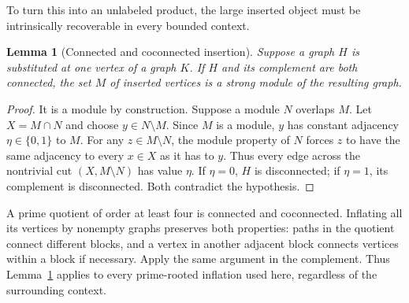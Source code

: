 \documentclass[11pt,letterpaper]{article}
\numberwithin{equation}{section}
\newtheorem{lemma}[theorem]{Lemma}
\theoremstyle{definition}\newtheorem{definition}[theorem]{Definition}
\theoremstyle{remark}\newtheorem{remark}[theorem]{Remark}
\begin{document}
To turn this into an unlabeled product, the large inserted object
must be intrinsically recoverable in every bounded context.

\begin{lemma}[Connected and coconnected insertion]\label{prg:lem:insertion}
Suppose a graph $H$ is substituted at one vertex of a graph $K$.
If $H$ and its complement are both connected, the set $M$ of
inserted vertices is a strong module of the resulting graph.
\end{lemma}
\begin{proof}
It is a module by construction. Suppose a module $N$ overlaps $M$.
Let $X=M\cap N$ and choose $y\in N\setminus M$. Since $M$ is a
module, $y$ has constant adjacency $\eta\in\{0,1\}$ to $M$.
For any $z\in M\setminus N$, the module property of $N$ forces
$z$ to have the same adjacency to every $x\in X$ as it has to $y$.
Thus every edge across the nontrivial cut $(X,M\setminus N)$ has
value $\eta$. If $\eta=0$, $H$ is disconnected; if $\eta=1$, its
complement is disconnected. Both contradict the hypothesis.
\end{proof}

A prime quotient of order at least four is connected and
coconnected. Inflating all its vertices by nonempty graphs preserves
both properties: paths in the quotient connect different blocks,
and a vertex in another adjacent block connects vertices within a
block if necessary. Apply the same argument in the complement.
Thus Lemma~\ref{prg:lem:insertion} applies to every prime-rooted
inflation used here, regardless of the surrounding context.
\end{document}
